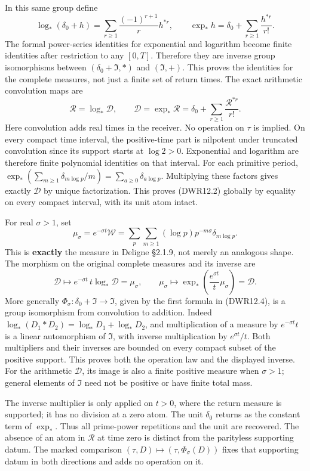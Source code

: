 In this same group define \[
\log_*(\delta_0+h)=\sum_{r\ge1}\frac{(-1)^{r+1}}r h^{*r},
\qquad
\exp_*h=\delta_0+\sum_{r\ge1}\frac{h^{*r}}{r!}.
\tag{DWR12.1a}
\] The formal power-series identities for exponential and logarithm
become finite identities after restriction to any \([0,T]\). Therefore
they are inverse group isomorphisms between \((\delta_0+\mathfrak I,*)\)
and \((\mathfrak I,+)\). This proves the identities for the complete
measures, not just a finite set of return times. The exact arithmetic
convolution maps are \[
\mathcal R=\log_*\mathcal D,\qquad
\mathcal D=\exp_*\mathcal R
=\delta_0+\sum_{r\ge1}\frac{\mathcal R^{*r}}{r!}.
\tag{DWR12.2}
\] Here convolution adds real times in the receiver. No operation on
\(\tau\) is implied. On every compact time interval, the positive-time
part is nilpotent under truncated convolution since its support starts
at \(\log2>0\). Exponential and logarithm are therefore finite
polynomial identities on that interval. For each primitive period,
\(\exp_*(\sum_{m\ge1}\delta_{m\log p}/m)=\sum_{a\ge0}\delta_{a\log p}\).
Multiplying these factors gives exactly \(\mathcal D\) by unique
factorization. This proves (DWR12.2) globally by equality on every
compact interval, with its unit atom intact.

For real \(\sigma>1\), set \[
\mu_\sigma=e^{-\sigma t}\mathcal W
=\sum_p\sum_{m\ge1}(\log p)p^{-m\sigma}\delta_{m\log p}.
\tag{DWR12.3}
\] This is \textbf{exactly} the measure in Deligne §2.1.9, not merely an
analogous shape. The morphism on the original complete measures and its
inverse are \[
\mathcal D\longmapsto e^{-\sigma t}\,t\log_*\mathcal D=\mu_\sigma,
\qquad
\mu_\sigma\longmapsto
\exp_*\left(\frac{e^{\sigma t}}t\mu_\sigma\right)=\mathcal D.
\tag{DWR12.4}
\] More generally \(\Phi_\sigma:\delta_0+\mathfrak I\to\mathfrak I\),
given by the first formula in (DWR12.4), is a group isomorphism from
convolution to addition. Indeed \(\log_*(D_1*D_2)=\log_*D_1+\log_*D_2\),
and multiplication of a measure by \(e^{-\sigma t}t\) is a linear
automorphism of \(\mathfrak I\), with inverse multiplication by
\(e^{\sigma t}/t\). Both multipliers and their inverses are bounded on
every compact subset of the positive support. This proves both the
operation law and the displayed inverse. For the arithmetic
\(\mathcal D\), its image is also a finite positive measure when
\(\sigma>1\); general elements of \(\mathfrak I\) need not be positive
or have finite total mass.

The inverse multiplier is only applied on \(t>0\), where the return
measure is supported; it has no division at a zero atom. The unit
\(\delta_0\) returns as the constant term of \(\exp_*\). Thus all
prime-power repetitions and the unit are recovered. The absence of an
atom in \(\mathcal R\) at time zero is distinct from the parityless
supporting datum. The marked comparison
\((\tau,D)\mapsto(\tau,\Phi_\sigma(D))\) fixes that supporting datum in
both directions and adds no operation on it.

